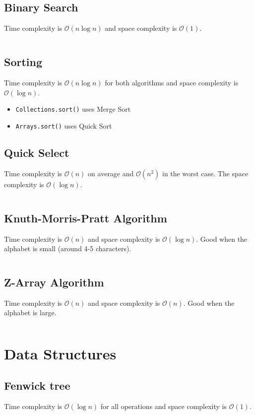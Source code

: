 \documentclass[8pt,a4paper,landscape,oneside]{amsart}
\newcommand{\code}[1]{\inputminted[fontsize=\normalsize,baselinestretch=1]{java}{code/#1}}
\newcommand{\bigO}{\mathcal{O}}
\begin{document}
\begin{multicols*}{3}
  \subsection{Binary Search}
  Time complexity is $\bigO(n \log n)$ and space complexity is $\bigO(1)$.
  \code{Structures/BinarySearch.java}
  \subsection{Sorting}
  Time complexity is $\bigO(n \log n)$ for both algorithms and space complexity is $\bigO(\log n)$.
  \begin{itemize}
  \item \texttt{Collections.sort()} uses Merge Sort
  \item \texttt{Arrays.sort()} uses Quick Sort
  \end{itemize}
  
  \subsection{Quick Select}
  Time complexity is $\bigO(n)$ on average and $\bigO(n^2)$ in the worst case. The space complexity is $\bigO(\log n)$.
  \code{Structures/QuickSelect.java}
  
  \subsection{Knuth-Morris-Pratt Algorithm}
  Time complexity is $\bigO(n)$ and space complexity is $\bigO(\log n)$. Good when the alphabet is small (around 4-5 characters).
  \code{Structures/KMP.java}
  
  \subsection{Z-Array Algorithm}
  Time complexity is $\bigO(n)$ and space complexity is $\bigO(n)$. Good when the alphabet is large.
  \code{Structures/ZArray.java}
  
  
\section{Data Structures}
  \subsection{Fenwick tree}
  Time complexity is $\bigO(\log n)$ for all operations and space complexity is $\bigO(1)$.
  \code{Structures/Fenwick.java}
  

\end{multicols*}
\end{document}
